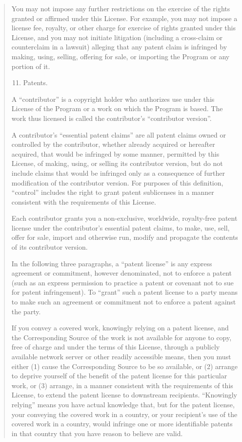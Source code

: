 \documentclass[letterpaper,10pt,english]{sphinxmanual}
\begin{document}
\begin{quote}
You may not impose any further restrictions on the exercise of the
rights granted or affirmed under this License.  For example, you may
not impose a license fee, royalty, or other charge for exercise of
rights granted under this License, and you may not initiate litigation
(including a cross-claim or counterclaim in a lawsuit) alleging that
any patent claim is infringed by making, using, selling, offering for
sale, or importing the Program or any portion of it.
\begin{enumerate}
\setcounter{enumi}{10}
\item {} 
Patents.

\end{enumerate}

A ``contributor'' is a copyright holder who authorizes use under this
License of the Program or a work on which the Program is based.  The
work thus licensed is called the contributor's ``contributor version''.

A contributor's ``essential patent claims'' are all patent claims
owned or controlled by the contributor, whether already acquired or
hereafter acquired, that would be infringed by some manner, permitted
by this License, of making, using, or selling its contributor version,
but do not include claims that would be infringed only as a
consequence of further modification of the contributor version.  For
purposes of this definition, ``control'' includes the right to grant
patent sublicenses in a manner consistent with the requirements of
this License.

Each contributor grants you a non-exclusive, worldwide, royalty-free
patent license under the contributor's essential patent claims, to
make, use, sell, offer for sale, import and otherwise run, modify and
propagate the contents of its contributor version.

In the following three paragraphs, a ``patent license'' is any express
agreement or commitment, however denominated, not to enforce a patent
(such as an express permission to practice a patent or covenant not to
sue for patent infringement).  To ``grant'' such a patent license to a
party means to make such an agreement or commitment not to enforce a
patent against the party.

If you convey a covered work, knowingly relying on a patent license,
and the Corresponding Source of the work is not available for anyone
to copy, free of charge and under the terms of this License, through a
publicly available network server or other readily accessible means,
then you must either (1) cause the Corresponding Source to be so
available, or (2) arrange to deprive yourself of the benefit of the
patent license for this particular work, or (3) arrange, in a manner
consistent with the requirements of this License, to extend the patent
license to downstream recipients.  ``Knowingly relying'' means you have
actual knowledge that, but for the patent license, your conveying the
covered work in a country, or your recipient's use of the covered work
in a country, would infringe one or more identifiable patents in that
country that you have reason to believe are valid.


\end{quote}
\end{document}
